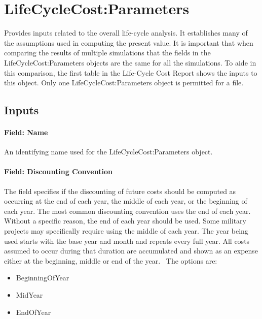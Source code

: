 \section{LifeCycleCost:Parameters}\label{lifecyclecostparameters}

Provides inputs related to the overall life-cycle analysis. It establishes many of the assumptions used in computing the present value. It is important that when comparing the results of multiple simulations that the fields in the LifeCycleCost:Parameters objects are the same for all the simulations. To aide in this comparison, the first table in the Life-Cycle Cost Report shows the inputs to this object. Only one LifeCycleCost:Parameters object is permitted for a file.

\subsection{Inputs}\label{inputs-058}

\paragraph{Field: Name}\label{field-name-056}

An identifying name used for the LifeCycleCost:Parameters object.

\paragraph{Field: Discounting Convention}\label{field-discounting-convention}

The field specifies if the discounting of future costs should be computed as occurring at the end of each year, the middle of each year, or the beginning of each year. The most common discounting convention uses the end of each year. Without a specific reason, the end of each year should be used. Some military projects may specifically require using the middle of each year. The year being used starts with the base year and month and repeats every full year. All costs assumed to occur during that duration are accumulated and shown as an expense either at the beginning, middle or end of the year.~ The options are:

\begin{itemize}
\item
  BeginningOfYear
\item
  MidYear
\item
  EndOfYear
\end{itemize}

